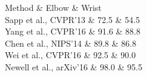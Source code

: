 Method & Elbow & Wrist \\

Sapp et al., CVPR'13  & 72.5 & 54.5 \\

Yang et al., CVPR'16  & 91.6 & 88.8 \\

Chen et al., NIPS'14  & 89.8 & 86.8 \\

Wei et al., CVPR'16  & 92.5 & 90.0 \\

Newell et al., arXiv'16  & 98.0 & 95.5 \\

